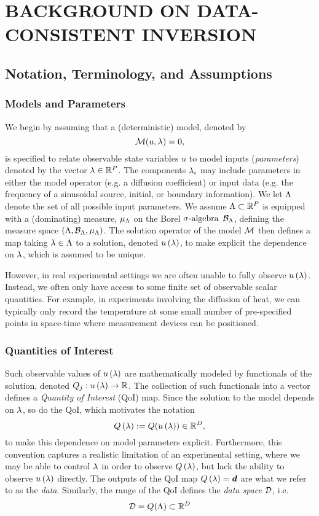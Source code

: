 \chapter{\uppercase{Background on Data-Consistent Inversion} \label{chapter:02}}

\section{Notation, Terminology, and Assumptions}
\subsection{Models and Parameters}
We begin by assuming that a (deterministic) model, denoted by $$\mathcal{M} (u, \lambda) = 0,$$ is specified to relate observable state variables $u$ to model inputs ({\em parameters}) denoted by the vector $\lambda\in\mathbb{R}^P$.
The components $\lambda_i$ may include parameters in either the model operator (e.g. a diffusion coefficient) or input data (e.g. the frequency of a sinusoidal source, initial, or boundary information).
We let ${\Lambda}$ denote the set of all possible input parameters.
We assume ${\Lambda}\subset\mathbb{R}^P$ is equipped with a (dominating) measure, $\mu_{{\Lambda}}$ on the Borel $\sigma\text{-algebra}$ $\mathcal{B}_{{\Lambda}}$, defining the measure space $({\Lambda}, \mathcal{B}_{{\Lambda}}, \mu_{{\Lambda}})$.
The solution operator of the model $\mathcal{M}$ then defines a map taking $\lambda\in{\Lambda}$ to a solution, denoted $u\left ( \lambda \right )$, to make explicit the dependence on $\lambda$, which is assumed to be unique.

However, in real experimental settings we are often unable to fully observe $u\left ( \lambda \right )$.
Instead, we often only have access to some finite set of observable scalar quantities.
For example, in experiments involving the diffusion of heat, we can typically only record the temperature at some small number of pre-specified points in space-time where measurement devices can be positioned.

\subsection{Quantities of Interest}
Such observable values of $u\left ( \lambda \right )$ are mathematically modeled by functionals of the solution, denoted $Q_j: u\left ( \lambda \right ) \to \mathbb{R}$.
The collection of such functionals into a vector defines a {\em Quantity of Interest} (QoI) map.
Since the solution to the model depends on $\lambda$, so do the QoI, which motivates the notation
$$Q\left ( \lambda \right ) := Q( u\left ( \lambda \right ) ) \in\mathbb{R}^D,$$
to make this dependence on model parameters explicit.
Furthermore, this convention captures a realistic limitation of an experimental setting, where we may be able to control $\lambda$ in order to observe $Q\left ( \lambda \right )$, but lack the ability to observe $u\left ( \lambda \right )$ directly.
The outputs of the QoI map $Q\left ( \lambda \right ) = \operatorname*{\boldsymbol{d}}$ are what we refer to as the \emph{data}.
Similarly, the range of the QoI defines the \emph{data space} $\mathcal{D}$, i.e.
$$\mathcal{D} = Q({\Lambda}) \subset \mathbb{R}^D$$

